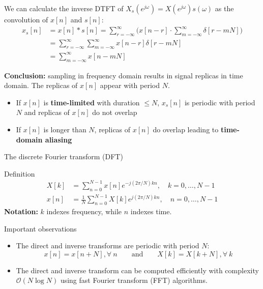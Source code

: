\documentclass[10pt]{beamer}
\begin{document}
%
\begin{frame}

We can calculate the inverse DTFT of $X_s(e^{j\omega}) = X(e^{j\omega})s(\omega)$ as the convolution of $x[n]$ and $s[n]$:
\begin{align*}
x_s[n] &= x[n]\ast s[n] = \sum_{r=-\infty}^{\infty} \bigg(x[n-r]\cdot \sum_{m=-\infty}^\infty\delta[r-mN]\bigg)\\
&= \sum_{r=-\infty}^{\infty} \sum_{m=-\infty}^\infty x[n-r]\delta[r-mN] \tag{only non-zero when $r = mN$} \\
&= \sum_{m=-\infty}^\infty x[n-mN]
\end{align*}

\textbf{Conclusion:} sampling in frequency domain results in signal replicas in time domain. The replicas of $x[n]$ appear with period $N$.

\begin{itemize}
	\item If $x[n]$ is \textbf{time-limited} with duration $\leq N$, $x_s[n]$ is periodic with period $N$ and replicas of $x[n]$ do not overlap
	\item If $x[n]$ is longer than $N$, replicas of $x[n]$ do overlap leading to \textbf{time-domain aliasing}
\end{itemize}

\end{frame}


\begin{frame}{The discrete Fourier transform (DFT)}
\begin{block}{Definition}
	\vspace{-0.6cm}
	\begin{align}
		X[k] &= \sum_{n = 0}^{N-1}x[n]e^{-j(2\pi/N)kn},\quad k = 0, \ldots, N-1 \tag{direct transform} \\
		x[n] &= \frac{1}{N}\sum_{n = 0}^{N-1}X[k]e^{j(2\pi/N)kn}, \quad n = 0, \ldots, N-1 \tag{inverse transform}
	\end{align}
	\noindent\textbf{Notation:} $k$ indexes frequency, while $n$ indexes time.
\end{block}

\begin{block}{Important observations}
\begin{itemize}
	\item The direct and inverse transforms are periodic with period $N$:
	\begin{equation*}
	x[n] = x[n+N], \forall~n \qquad\text{and}\qquad X[k] = X[k+N], \forall~k
	\end{equation*}
	\item The direct and inverse transform can be computed efficiently with complexity $\mathcal{O}({N\log N})$ using fast Fourier transform (FFT) algorithms.
\end{itemize}
\end{block}
\end{frame}
\end{document}
